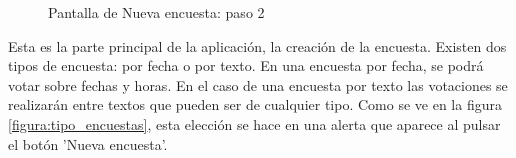 \documentclass[a4paper, 12pt]{book}
\begin{document}
\begin{figure}[H]
 \centering
 \caption{Pantalla de Nueva encuesta: paso 2}
 \label{f:enviar_encuesta}
\end{figure}


Esta es la parte principal de la aplicaci\'on, la creaci\'on de la encuesta.
Existen dos tipos de encuesta: por fecha o por texto. En una encuesta por fecha, se podr\'a 
votar sobre fechas y horas. En el caso de una encuesta por texto las votaciones se realizar\'an
entre textos que pueden ser de cualquier tipo. Como se ve en la figura \ref{figura:tipo_encuestas}, esta elecci\'on se hace
en una alerta que aparece al pulsar el bot\'on 'Nueva encuesta'.
\end{document}
